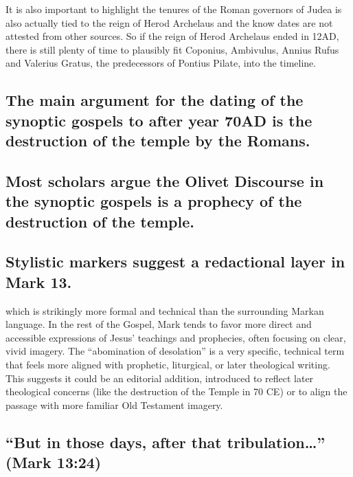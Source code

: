 It is also important to highlight the tenures of the Roman governors of Judea is also actually tied to the reign of Herod Archelaus and the know dates are not attested from other sources.
So if the reign of Herod Archelaus ended in 12AD, there is still plenty of time to plausibly fit Coponius, Ambivulus, Annius Rufus and Valerius Gratus, the predecessors of Pontius Pilate, into the timeline.

\subsection{The main argument for the dating of the synoptic gospels to after year 70AD is the destruction of the temple by the Romans.}\label{subsec:the-main-argument-for-the-dating-of-the-synoptic-gospels-to-after-year-70ad-is-the-destruction-of-the-temple-by-the-romans.}

\subsection{Most scholars argue the Olivet Discourse in the synoptic gospels is a prophecy of the destruction of the temple.}\label{subsec:most-scholars-argue-the-olivet-discourse-in-the-synoptic-gospels-is-a-prophecy-of-the-destruction-of-the-temple.}

\subsection{Stylistic markers suggest a redactional layer in Mark 13.}\label{subsec:at-the-same-time-the-textual-analysis-of-mark-shows-that-these-verses-were-added-later.}

which is strikingly more formal and technical than the surrounding Markan language.
In the rest of the Gospel, Mark tends to favor more direct and accessible expressions of Jesus' teachings and prophecies, often focusing on clear, vivid imagery.
The ``abomination of desolation'' is a very specific, technical term that feels more aligned with prophetic, liturgical, or later theological writing.
This suggests it could be an editorial addition, introduced to reflect later theological concerns (like the destruction of the Temple in 70 CE) or to align the passage with more familiar Old Testament imagery.

\subsection{\texorpdfstring{``But in those days, after that tribulation\ldots{}'' (Mark 13:24)}{4.
``But in those days, after that tribulation\ldots'' (Mark 13:24)}}\label{subsec:but-in-those-days-after-that-tribulation-mark-1324}

